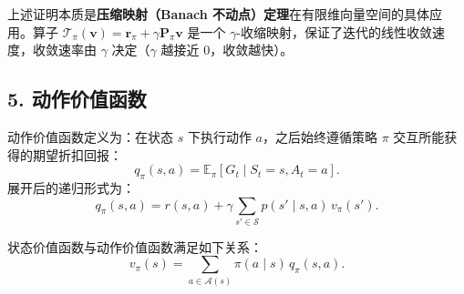 \documentclass[UTF8]{article}
\begin{document}
\begin{remarkbox}
  上述证明本质是\textbf{压缩映射（Banach 不动点）定理}在有限维向量空间的具体应用。算子 $\mathcal{T}_\pi(\boldsymbol{v}) = \boldsymbol{r}_\pi + \gamma \boldsymbol{P}_\pi \boldsymbol{v}$ 是一个 $\gamma$-收缩映射，保证了迭代的线性收敛速度，收敛速率由 $\gamma$ 决定（$\gamma$ 越接近 0，收敛越快）。
\end{remarkbox}

\subsection*{5. 动作价值函数}
动作价值函数定义为：在状态 $s$ 下执行动作 $a$，之后始终遵循策略 $\pi$ 交互所能获得的期望折扣回报：
\[
  q_\pi(s,a) = \mathbb{E}_\pi\left[ G_t \mid S_t = s, A_t = a \right].
\]
展开后的递归形式为：
\[
  q_\pi(s,a) = r(s,a) + \gamma \sum_{s' \in \mathcal{S}} p(s' \mid s,a) \, v_\pi(s').
\]

状态价值函数与动作价值函数满足如下关系：
\[
  v_\pi(s) = \sum_{a \in \mathcal{A}(s)} \pi(a \mid s) \, q_\pi(s,a).
\]
\end{document}
